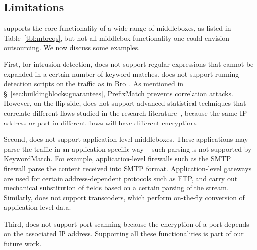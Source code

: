 \subsection{Limitations}\label{s:limitations}

 \sys supports the core functionality of a wide-range of  middleboxes, as listed in Table~\ref{tbl:mbreqs},
but not all middlebox functionality one could envision outsourcing. We now discuss some examples.

First, for intrusion detection, \sys does not support regular expressions that cannot be expanded 
in a certain number of keyword matches. \sys does not support running detection scripts on the traffic 
as in Bro~\cite{bro}. As mentioned in \S~\ref{sec:buildingblocks:guarantees}, PrefixMatch prevents correlation attacks.
However, on the flip side, \sys does not support advanced statistical techniques that correlate different flows
studied in the research literature~\cite{steppingstones}, because the same IP address or port in different flows
will have different encryptions.

Second, \sys does not support application-level middleboxes.
These applications may parse the traffic in an application-specific way -- such parsing is not supported by KeywordMatch.
For example, application-level firewalls such as the SMTP firewall parse the content received into SMTP format. Application-level gateways are used for  certain address-dependent 
protocols such as FTP, and carry 
out mechanical substitution of fields based on a certain parsing of the stream.
Similarly, \sys does not support transcoders, which perform on-the-fly conversion of application level 
data.

Third, \sys does not support port scanning because the encryption of a port depends on the associated IP address. 
Supporting all these functionalities is part of our future work.


